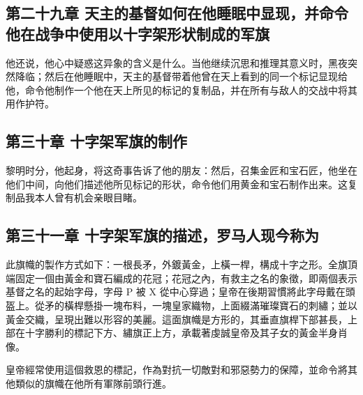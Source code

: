 
\subsection{第二十九章 天主的基督如何在他睡眠中显现，并命令他在战争中使用以十字架形状制成的军旗}

他还说，他心中疑惑这异象的含义是什么。当他继续沉思和推理其意义时，黑夜突然降临；然后在他睡眠中，天主的基督带着他曾在天上看到的同一个标记显现给他，命令他制作一个他在天上所见的标记的复制品，并在所有与敌人的交战中将其用作护符。\par


\subsection{第三十章 十字架军旗的制作}

黎明时分，他起身，将这奇事告诉了他的朋友：然后，召集金匠和宝石匠，他坐在他们中间，向他们描述他所见标记的形状，命令他们用黄金和宝石制作出来。这复制品我本人曾有机会亲眼目睹。\par


\subsection{第三十一章 十字架军旗的描述，罗马人现今称为}

此旗幟的製作方式如下：一根長矛，外鍍黃金，上橫一桿，構成十字之形。全旗頂端固定一個由黃金和寶石編成的花冠；花冠之內，有救主之名的象徵，即兩個表示基督之名的起始字母，字母 P 被 X 從中心穿過；皇帝在後期習慣將此字母戴在頭盔上。從矛的橫桿懸掛一塊布料，一塊皇家織物，上面綴滿璀璨寶石的刺繡；並以黃金交織，呈現出難以形容的美麗。這面旗幟是方形的，其垂直旗桿下部甚長，上部在十字勝利的標記下方、繡旗正上方，承載著虔誠皇帝及其子女的黃金半身肖像。\par

皇帝經常使用這個救恩的標記，作為對抗一切敵對和邪惡勢力的保障，並命令將其他類似的旗幟在他所有軍隊前頭行進。\par


